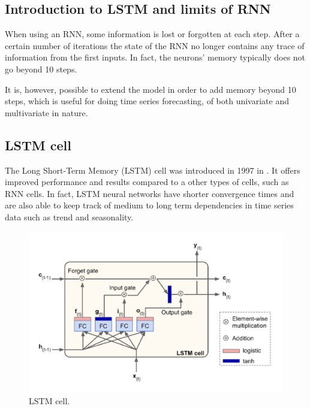 \subsection{Introduction to LSTM and limits of RNN}
When using an RNN, some information is lost  or forgotten at each step. After a certain number of iterations the state of the RNN no longer contains any trace of information from the first inputs. In fact, the neurons' memory typically does not go beyond 10 steps.

It is, however, possible to extend the model in order to add memory beyond 10 steps, which is useful for doing time series forecasting, of both univariate and multivariate in nature.

\subsection{LSTM cell} \label{lstmcell}
The Long Short-Term Memory (LSTM) cell was introduced in 1997 in \citeauthor{LSTM} \autocite{LSTM}.
It offers improved performance and results compared to a other types of cells, such as RNN cells. In fact, LSTM neural networks have shorter convergence times and are also able to keep track of medium to long term dependencies in time series data such as trend and seasonality.

\begin{figure} [h]
    \centering
    \includegraphics[width=\textwidth,height=\textheight,keepaspectratio]{Assets/Theory_and_methods/unnamed-8.png}
    \caption{LSTM cell.}
    \label{fig:LSTM_cell}
\end{figure}

